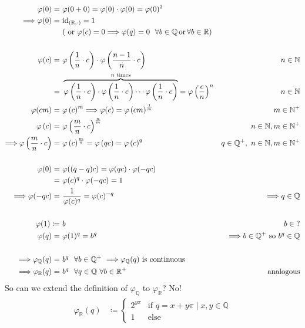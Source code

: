 \documentclass[12pt, a4paper]{article}
\begin{document}
\begin{align*}
\varphi(0) =&~ \varphi(0+0) = \varphi(0) \cdot \varphi(0) = \varphi(0)^2 \\
\Longrightarrow \varphi(0) =&~ \text{id}_{(\mathbb{R}, \cdot)} = 1\\
&~(\text{ or } \varphi(c) = 0 \Longrightarrow \varphi(q) = 0 ~~\forall b\in\mathbb{Q}\text{\,or\,}\forall b\in\mathbb{R})\\~\\
\varphi(c) =&~ \varphi\left({\frac{1}{n}\cdot c}\right) \cdot \varphi\left({\frac{n-1}{n}\cdot c}\right) & n\in \mathbb{N} \\
=&~\overbrace{\varphi\left({\frac{1}{n}\cdot c}\right) \cdot \varphi\left({\frac{1}{n}\cdot c}\right)\cdots \varphi\left({\frac{1}{n}\cdot c}\right)}^{n \text{ times}} = \varphi\left({\frac{c}{n}}\right)^n & n\in \mathbb{N}\\
\varphi(cm) =&~ \varphi\left({c}\right)^m \Longrightarrow \varphi(c) = \varphi\left({cm}\right)^\frac{1}{m} & m\in \mathbb{N}^+\\
\varphi\left(c\right) =&~ \varphi\left({\frac{m}{n}\cdot c}\right)^\frac{n}{m} & n\in \mathbb{N},m\in \mathbb{N}^+\\
\Longrightarrow \varphi\left(\frac{m}{n}\cdot c\right) =&~ \varphi\left({c}\right)^\frac{m}{n} = \varphi\left(q c\right) = \varphi\left({c}\right)^q & q\in \mathbb{Q}^+,~ n\in \mathbb{N},m\in \mathbb{N}^+\\~\\
\varphi(0) =&~ \varphi((q-q)c) = \varphi(qc) \cdot \varphi(-qc)\\
 =&~ \varphi(c)^q \cdot \varphi(-qc) = 1 \\
\Longrightarrow \varphi(-qc) =&~ \frac{1}{ \varphi(c)^q} =  \varphi(c)^{-q} & \Longrightarrow q\in \mathbb{Q}\\~\\
\varphi(1) \coloneqq&~ b & b \in \mathbb{?}\\
\varphi(q) =&~ \varphi(1)^q = b^q & \Longrightarrow b \in \mathbb{Q}^+ \text{ so } b^q \in \mathbb{Q} \\~\\
\Longrightarrow \varphi_\mathbb{Q}(q) =&~ b^q ~~\forall b\in\mathbb{Q}^+ ~\Longrightarrow  \varphi_\mathbb{Q}(q) \text{ is}\text{ continuous}\\
\Longrightarrow \varphi_\mathbb{R}(q) =&~ b^q ~~\forall q\in\mathbb{Q}~\forall b\in\mathbb{R}^+ & \text{analogous}
\end{align*}
So can we extend the definition of $\varphi_\mathbb{Q}$ to $\varphi_\mathbb{R}$? No!
\begin{align*}
\varphi_\mathbb{R}(q) &\coloneqq \left\{\begin{array}{rl}2^{y\pi}	 & \text{if } q = x + y\pi \mid x,y\in\mathbb{Q}\\ 1& \text{else}\end{array}\right.
\end{align*}
\end{document}
